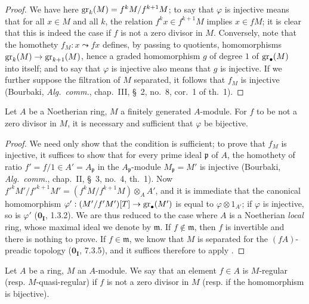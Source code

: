 \begin{proof}
We have here $\operatorname{gr}_k(M)=f^kM/f^{k+1}M$;
to say that $\varphi$ is injective means that for all $x\in M$ and all $k$, the relation $f^kx\in f^{k+1}M$ implies $x\in fM$;
it is clear that this is indeed the case if $f$ is not a zero divisor in $M$.
Conversely, note that the homothety $f_M:x\leadsto fx$ defines, by passing to quotients, homomorphisms $\operatorname{gr}_k(M)\to\operatorname{gr}_{k+1}(M)$, hence a graded homomorphism $g$ of degree $1$ of $\operatorname{gr}_\bullet(M)$ into itself;
and to say that $\varphi$ is injective also means that $g$ is injective.
If we further suppose the filtration of $M$ separated, it follows that $f_M$ is injective
(Bourbaki, \emph{Alg.~comm.}, chap.~III, \S~2, no.~8, cor.~1 of th.~1).
\end{proof}

\begin{corollary}[15.1.3]
\label{0.15.1.3}
Let $A$ be a Noetherian ring, $M$ a finitely generated $A$-module.
For $f$ to be not a zero divisor in $M$, it is necessary and sufficient that $\varphi$ be bijective.
\end{corollary}

\begin{proof}
We need only show that the condition is sufficient;
to prove that $f_M$ is injective, it suffices to show that for every prime ideal $\mathfrak{p}$ of $A$, the homothety of ratio $f'=f/1\in A'=A_\mathfrak{p}$ in the $A_\mathfrak{p}$-module $M_\mathfrak{p}=M'$ is injective
(Bourbaki, \emph{Alg.~comm.}, chap.~II, \S~3, no.~4, th.~1).
Now $f'^kM'/f'^{k+1}M'=(f^kM/f^{k+1}M)\otimes_A A'$, and it is immediate that the canonical homomorphism $\varphi':(M'/f'M')[T]\to\operatorname{gr}_\bullet(M')$ is equal to $\varphi\otimes 1_{A'}$;
if $\varphi$ is injective, so is $\varphi'$ ($\mathbf{0_I}$, 1.3.2).
We are thus reduced to the case where $A$ is a Noetherian \emph{local} ring, whose maximal ideal we denote by $\mathfrak{m}$.
If $f\notin\mathfrak{m}$, then $f$ is invertible and there is nothing to prove.
If $f\in\mathfrak{m}$, we know that $M$ is separated for the $(fA)$-preadic topology ($\mathbf{0_I}$, 7.3.5), and it suffices therefore to apply .
\end{proof}

\begin{definition}[15.1.4]
\label{0.15.1.4}
Let $A$ be a ring, $M$ an $A$-module.
We say that an element $f\in A$ is $M$-regular (\textup{resp.} $M$-quasi-regular) if $f$ is not a zero divisor in $M$ (\textup{resp.} if the homomorphism  is bijective).
\end{definition}

